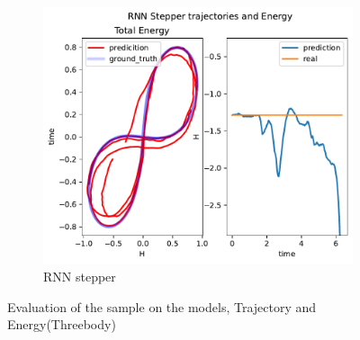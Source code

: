 \begin{figure}[H]
\begin{subfigure}[b]{0.3\textwidth}
		\centering
		\includegraphics[width=\textwidth]{chapters/chapter5/body3_rne_traj.pdf}
		\caption{RNN stepper}
	\end{subfigure}
	
	\caption{Evaluation of the sample on the models, Trajectory and Energy(Threebody)}
\end{figure}

